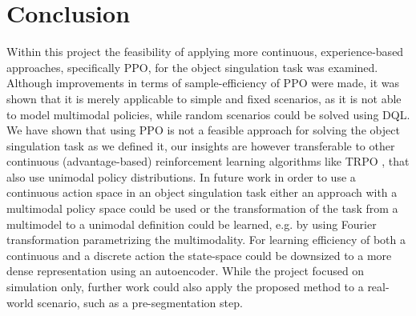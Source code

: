 \documentclass{article}
\begin{document}

\section{Conclusion}
\label{sec:conclusion}
Within this project the feasibility of applying more continuous, experience-based approaches, specifically PPO, for the object singulation task was examined. Although improvements in terms of sample-efficiency of PPO were made, it was shown that it is merely applicable to simple and fixed scenarios, as it is not able to model multimodal policies, while random scenarios could be solved using DQL.
\newline
We have shown that using PPO is not a feasible approach for solving the object singulation task as we defined it, our insights are however transferable to other continuous (advantage-based) reinforcement learning algorithms like TRPO \citep{trpo}, that also use unimodal policy distributions. In future work in order to use a continuous action space in an object singulation task either an approach with a multimodal policy space could be used or the transformation of the task from a multimodel to a unimodal definition could be learned, e.g. by using Fourier transformation parametrizing the multimodality. For learning efficiency of both a continuous and a discrete action the state-space could be downsized to a more dense representation using an autoencoder. While the project focused on simulation only, further work could also apply the proposed method to a real-world scenario, such as a pre-segmentation step.   



\clearpage
\end{document}
